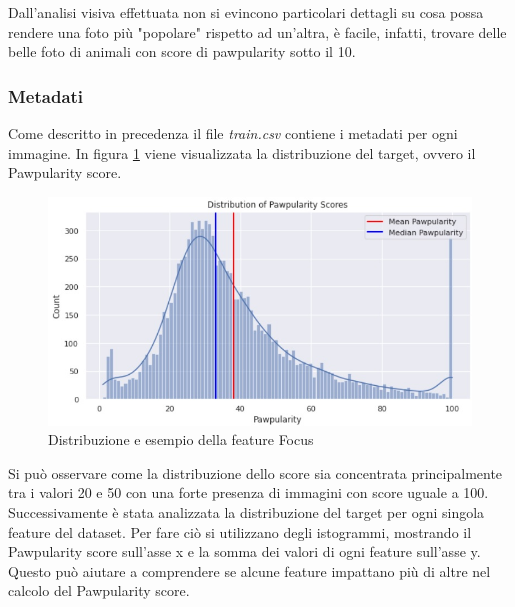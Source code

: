     Dall'analisi visiva effettuata non si evincono particolari dettagli su cosa possa rendere una foto più "popolare" rispetto ad un'altra, è facile, infatti, trovare delle belle foto di animali con score di pawpularity sotto il 10.

    \subsubsection{Metadati}
    Come descritto in precedenza il file \textit{train.csv} contiene i metadati per ogni immagine. In figura \ref{fig:target} viene visualizzata la distribuzione del target, ovvero il Pawpularity score.
    \begin{figure}[H]
        \centering
        \includegraphics[scale=0.6]{Plot/distribution_target.jpg}
        \caption{Distribuzione e esempio della feature Focus}
        \label{fig:target}
    \end{figure}

    Si può osservare come la distribuzione dello score sia concentrata principalmente tra i valori 20 e 50 con una forte presenza di immagini con score uguale a 100.
    Successivamente è stata analizzata la distribuzione del target per ogni singola feature del dataset.
    Per fare ciò si utilizzano degli istogrammi, mostrando il Pawpularity score sull'asse x e la somma dei valori di ogni feature sull'asse y. Questo può aiutare a comprendere se alcune feature impattano più di altre nel calcolo del Pawpularity score.


